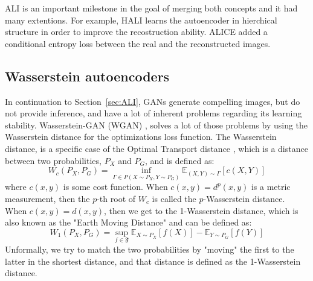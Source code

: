 \documentclass[graybox]{svmult}
\begin{document}
ALI is an important milestone in the goal of merging both concepts and it had many extentions.
For example, HALI \cite{HALI} learns the autoencoder in hierchical structure in order to improve the recostruction ability.
ALICE \cite{ALICE} added a conditional entropy loss between the real and the reconstructed images.


\subsection{Wasserstein autoencoders}
\label{sec:WAE}
In continuation to Section~\ref{sec:ALI}, GANs generate compelling images, but do not provide inference, and have a lot of inherent problems regarding its learning stability.
Wasserstein-GAN (WGAN) \cite{WGAN}, solves a lot of those problems by using the Wasserstein distance for the optimizations loss function. The Wasserstein distance, is a specific case of the Optimal Transport distance \cite{OT}, which is a distance between two probabilities, $P_X$ and $P_G$, and is defined as:
\begin{equation}
    W_c(P_X, P_G)=\inf_{\Gamma\in P(X\sim P_X, Y\sim P_G)} \mathbb{E}_{(X,Y)\sim \Gamma}[c(X,Y)]
\end{equation}
where $c(x,y)$ is some cost function. When $c(x,y)=d^p(x,y)$ is a metric measurement, then the $p$-th root of $W_c$ is called the $p$-Wasserstein distance. When $c(x,y)=d(x,y)$, then we get to the 1-Wasserstein distance, which is also known as the "Earth Moving Distance" \cite{EMD} and can be defined as:
\begin{equation}
    W_1(P_X, P_G)=\sup_{f\in\mathfrak{F}}\mathbb{E}_{X\sim P_X}[f(X)]-\mathbb{E}_{Y\sim P_G}[f(Y)]
\end{equation}
Unformally, we try to match the two probabilities by "moving" the first to the latter in the shortest distance, and that distance is defined as the 1-Wasserstein distance.
\end{document}
